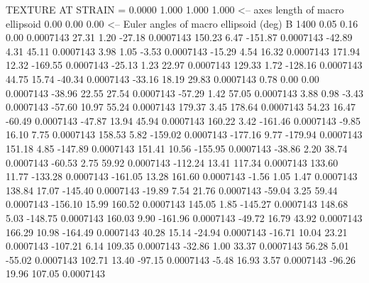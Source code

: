 TEXTURE AT STRAIN =    0.0000
   1.000   1.000   1.000  <-- axes length of macro ellipsoid
    0.00    0.00    0.00  <-- Euler angles of macro ellipsoid (deg)
B      1400
        0.05        0.16        0.00     0.0007143
       27.31        1.20      -27.18     0.0007143
      150.23        6.47     -151.87     0.0007143
      -42.89        4.31       45.11     0.0007143
        3.98        1.05       -3.53     0.0007143
      -15.29        4.54       16.32     0.0007143
      171.94       12.32     -169.55     0.0007143
      -25.13        1.23       22.97     0.0007143
      129.33        1.72     -128.16     0.0007143
       44.75       15.74      -40.34     0.0007143
      -33.16       18.19       29.83     0.0007143
        0.78        0.00        0.00     0.0007143
      -38.96       22.55       27.54     0.0007143
      -57.29        1.42       57.05     0.0007143
        3.88        0.98       -3.43     0.0007143
      -57.60       10.97       55.24     0.0007143
      179.37        3.45      178.64     0.0007143
       54.23       16.47      -60.49     0.0007143
      -47.87       13.94       45.94     0.0007143
      160.22        3.42     -161.46     0.0007143
       -9.85       16.10        7.75     0.0007143
      158.53        5.82     -159.02     0.0007143
     -177.16        9.77     -179.94     0.0007143
      151.18        4.85     -147.89     0.0007143
      151.41       10.56     -155.95     0.0007143
      -38.86        2.20       38.74     0.0007143
      -60.53        2.75       59.92     0.0007143
     -112.24       13.41      117.34     0.0007143
      133.60       11.77     -133.28     0.0007143
     -161.05       13.28      161.60     0.0007143
       -1.56        1.05        1.47     0.0007143
      138.84       17.07     -145.40     0.0007143
      -19.89        7.54       21.76     0.0007143
      -59.04        3.25       59.44     0.0007143
     -156.10       15.99      160.52     0.0007143
      145.05        1.85     -145.27     0.0007143
      148.68        5.03     -148.75     0.0007143
      160.03        9.90     -161.96     0.0007143
      -49.72       16.79       43.92     0.0007143
      166.29       10.98     -164.49     0.0007143
       40.28       15.14      -24.94     0.0007143
      -16.71       10.04       23.21     0.0007143
     -107.21        6.14      109.35     0.0007143
      -32.86        1.00       33.37     0.0007143
       56.28        5.01      -55.02     0.0007143
      102.71       13.40      -97.15     0.0007143
       -5.48       16.93        3.57     0.0007143
      -96.26       19.96      107.05     0.0007143
